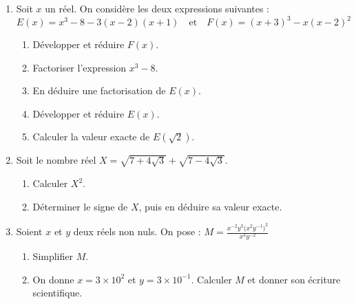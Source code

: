 \documentclass[10pt, a4paper]{article}
\begin{document}
\begin{Exercice}[][30 min]
\begin{enumerate}

\item  Soit $x$ un réel. On considère les deux expressions suivantes :
$$E(x) = x^3 - 8 - 3(x - 2)(x + 1) \quad \text{et} \quad
F(x) = (x + 3)^3 - x(x - 2)^2$$
\begin{enumerate}
    \item Développer et réduire $F(x)$.
    \item Factoriser l'expression $x^3 - 8$.
    \item En déduire une factorisation de $E(x)$.
    \item Développer et réduire $E(x)$.
    \item Calculer la valeur exacte de $E(\sqrt{2})$.
\end{enumerate}

\item Soit le nombre réel $X = \sqrt{7 + 4\sqrt{3}} + \sqrt{7 - 4\sqrt{3}}$.

\begin{enumerate}
    \item Calculer $X^2$.
    \item Déterminer le signe de $X$, puis en déduire sa valeur exacte.
\end{enumerate}


\item Soient $x$ et $y$ deux réels non nuls. On pose : 
$M = \frac{x^{-2} y^3 \big(x^2 y^{-1}\big)^2}{x^3 y^{-2}}$

\begin{enumerate}
    \item Simplifier $M$.
    \item On donne $x = 3 \times 10^2$ et $y = 3 \times 10^{-1}$. Calculer $M$ et donner son écriture scientifique.
\end{enumerate}
\end{enumerate}
\end{Exercice}
\end{document}
